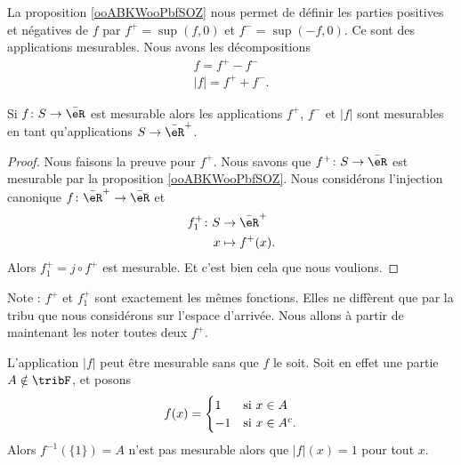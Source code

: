 \begin{normaltext}
    La proposition \ref{ooABKWooPbfSOZ} nous permet de définir les parties positives et négatives de \( f\) par \( f^+=\sup(f,0)\) et \( f^-=\sup(-f,0)\). Ce sont des applications mesurables. Nous avons les décompositions
    \begin{subequations}
        \begin{align}
            f=f^+-f^-\\
            | f |=f^++f^-.
        \end{align}
    \end{subequations}
\end{normaltext}

\begin{corollary}
    Si \( f\colon S\to \bar \eR\) est mesurable alors les applications \( f^+\), \( f^-\) et \( | f |\) sont mesurables en tant qu'applications \( S\to\bar \eR^+\).
\end{corollary}

\begin{proof}
    Nous faisons la preuve pour \( f^+\). Nous savons que \( f^+\colon S\to \bar \eR\) est mesurable par la proposition \ref{ooABKWooPbfSOZ}. Nous considérons l'injection canonique \( f\colon \bar \eR^+\to \bar \eR\) et 
    \begin{equation}
        \begin{aligned}
            f_1^+\colon S&\to \bar \eR^+ \\
            x&\mapsto f^+(x). 
        \end{aligned}
    \end{equation}
    Alors \( f_1^+=j\circ f^+\) est mesurable. Et c'est bien cela que nous voulions.

\end{proof}
Note : \( f^+\) et \( f_1^+\) sont exactement les mêmes fonctions. Elles ne diffèrent que par la tribu que nous considérons sur l'espace d'arrivée. Nous allons à partir de maintenant les noter toutes deux \( f^+\).

\begin{remark}
    L'application \( | f |\) peut être mesurable sans que \( f\) le soit. Soit en effet une partie \( A\notin \tribF\), et posons
    \begin{equation}
        f(x)=\begin{cases}
            1    &   \text{si \( x\in A\)}\\
            -1    &    \text{si \( x\in A^c\)}.
        \end{cases}
    \end{equation}
    Alors \( f^{-1}(\{ 1 \})=A\) n'est pas mesurable alors que \( | f |(x)=1\) pour tout \( x\).
\end{remark}


